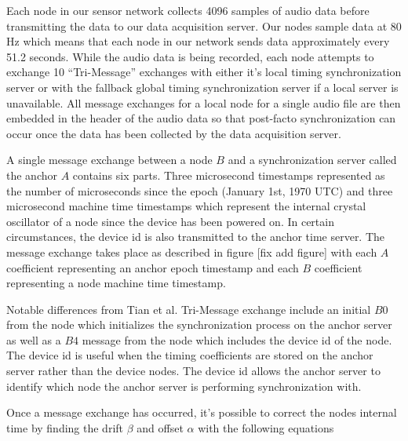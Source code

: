 Each node in our sensor network collects 4096 samples of audio data before transmitting the data to our data acquisition server. Our nodes sample data at 80 Hz which means that each node in our network sends data approximately every 51.2 seconds. While the audio data is being recorded, each node attempts to exchange 10 ``Tri-Message'' exchanges with either it's local timing synchronization server or with the fallback global timing synchronization server if a local server is unavailable. All message exchanges for a local node for a single audio file are then embedded in the header of the audio data so that post-facto synchronization can occur once the data has been collected by the data acquisition server.

A single message exchange between a node $B$ and a synchronization server called the anchor $A$ contains six parts. Three microsecond timestamps represented as the number of microseconds since the epoch (January 1st, 1970 UTC) and three microsecond machine time timestamps which represent the internal crystal oscillator of a node since the device has been powered on. In certain circumstances, the device id is also transmitted to the anchor time server. The message exchange takes place as described in figure [fix add figure] with each $A$ coefficient representing an anchor epoch timestamp and each $B$ coefficient representing a node machine time timestamp. 






Notable differences from Tian et al. Tri-Message exchange include an initial $B0$ from the node which initializes the synchronization process on the anchor server as well as a $B4$ message from the node which includes the device id of the node. The device id is useful when the timing coefficients are stored on the anchor server rather than the device nodes. The device id allows the anchor server to identify which node the anchor server is performing synchronization with.

Once a message exchange has occurred, it's possible to correct the nodes internal time by finding the drift $ \beta$ and offset $ \alpha$ with the following equations %


